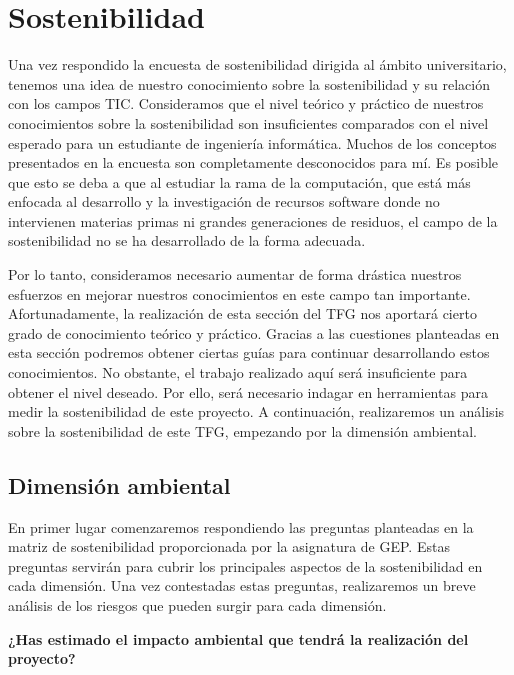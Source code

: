 \section{Sostenibilidad}
Una vez respondido la encuesta de sostenibilidad dirigida al ámbito universitario, tenemos una idea de nuestro conocimiento sobre la sostenibilidad y su relación con los campos TIC. Consideramos que el nivel teórico y práctico de nuestros conocimientos sobre la sostenibilidad son insuficientes comparados con el nivel esperado para un estudiante de ingeniería informática. Muchos de los conceptos presentados en la encuesta son completamente desconocidos para mí. Es posible que esto se deba a que al estudiar la rama de la computación, que está más enfocada al desarrollo y la investigación de recursos software donde no intervienen materias primas ni grandes generaciones de residuos, el campo de la sostenibilidad no se ha desarrollado de la forma adecuada.   

Por lo tanto, consideramos necesario aumentar de forma drástica nuestros esfuerzos en mejorar nuestros conocimientos en este campo tan importante. Afortunadamente, la realización de esta sección del TFG nos aportará cierto grado de conocimiento teórico y práctico. Gracias a las cuestiones planteadas en esta sección podremos obtener ciertas guías para continuar desarrollando estos conocimientos. No obstante, el trabajo realizado aquí será insuficiente para obtener el nivel deseado. Por ello, será necesario indagar en herramientas para medir la sostenibilidad de este proyecto. A continuación, realizaremos un análisis sobre la sostenibilidad de este TFG, empezando por la dimensión ambiental.

\subsection{Dimensión ambiental}
En primer lugar comenzaremos respondiendo las preguntas planteadas en la matriz de sostenibilidad  proporcionada por la asignatura de GEP. Estas preguntas servirán para cubrir los principales aspectos de la sostenibilidad en cada dimensión. Una vez contestadas estas preguntas, realizaremos un breve análisis de los riesgos que pueden surgir para cada dimensión.  

\textbf{¿Has estimado el impacto ambiental que tendrá la realización del proyecto?}  

